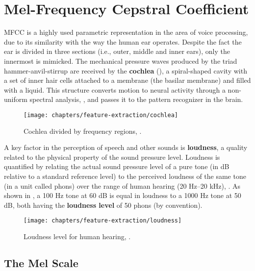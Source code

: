 \section{Mel-Frequency Cepstral Coefficient}

MFCC is a highly used parametric representation in the area of voice processing, due to its similarity with the way the human ear operates. Despite the fact the ear is divided in three sections (i.e., outer, middle and inner ears), only the innermost is mimicked. The mechanical pressure waves produced by the triad hammer-anvil-stirrup are received by the \textbf{cochlea} (), a spiral-shaped cavity with a set of inner hair cells attached to a membrane (the basilar membrane) and filled with a liquid. This structure converts motion to neural activity through a non-uniform spectral analysis, , and passes it to the pattern recognizer in the brain.

\begin{figure}[ht]
    \centering
    \texttt{[image: chapters/feature-extraction/cochlea]}
    \caption{Cochlea divided by frequency regions, .}
    \label{fig:cochlea}
\end{figure}

A key factor in the perception of speech and other sounds is \textbf{loudness}, a quality related to the physical property of the sound pressure level. Loudness is quantified by relating the actual sound pressure level of a pure tone (in dB relative to a standard reference level) to the perceived loudness of the same tone (in a unit called phons) over the range of human hearing (20 Hz–20 kHz), . As shown in , a 100 Hz tone at 60 dB is equal in loudness to a 1000 Hz tone at 50 dB, both having the \textbf{loudness level} of 50 phons (by convention).

\begin{figure}[ht]
    \centering
    \texttt{[image: chapters/feature-extraction/loudness]}
    \caption{Loudness level for human hearing, .}
    \label{fig:loudness}
\end{figure}

\subsection{The Mel Scale}

